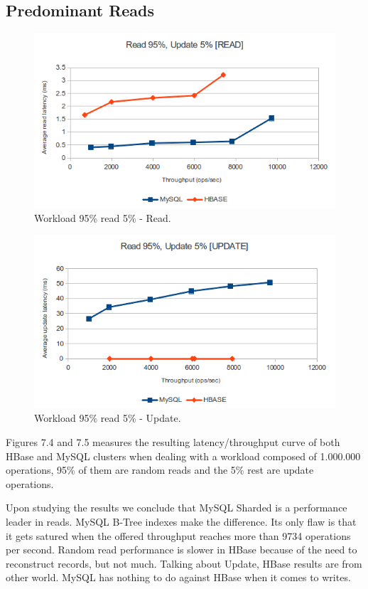 \subsection{Predominant Reads}

\begin{figure}[htb]
\centering
\includegraphics[width=1\textwidth]{./images/workloadBRead1.png}
\caption{Workload 95\% read 5\% - Read.}
 \label{fig:BRead}
\end{figure}

\begin{figure}[htb]
\centering
\includegraphics[width=1\textwidth]{./images/workloadBUpdate.png}
\caption{Workload 95\% read 5\% - Update.}
 \label{fig:BUpdate}
\end{figure}

Figures 7.4 and 7.5 measures the resulting latency/throughput curve of both HBase and MySQL clusters when dealing with a workload composed of 1.000.000 operations, 95\% of them are random reads and the 5\% rest are update operations.
\par
Upon studying the results we conclude that MySQL Sharded is a performance leader in reads. MySQL B-Tree indexes make the difference. Its only flaw is that it gets satured when the offered throughput reaches more than 9734 operations per second. Random read performance is slower in HBase because of the need to reconstruct records, but not much. Talking about Update, HBase results are from other world. MySQL has nothing to do against HBase when it comes to writes.














